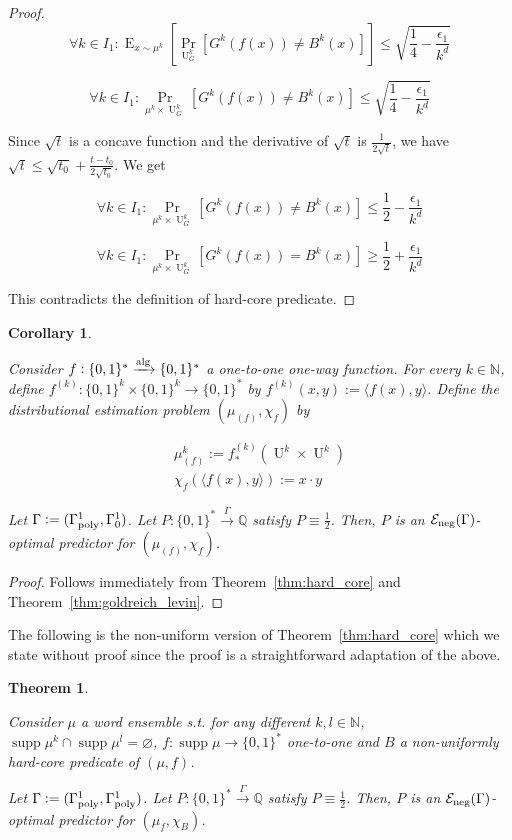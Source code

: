\documentclass{article}
\numberwithin{equation}{section}
\theoremstyle{definition}
\theoremstyle{plain}
\newtheorem{theorem}{Theorem}[section]
\newtheorem{corollary}{Corollary}[section]
\newcommand{\Bool}{\{0,1\}}
\newcommand{\Words}{{\Bool^*}}
\newcommand{\WordsLen}[1]{{\Bool^{#1}}}
\DeclareMathOperator{\Supp}{supp}
\DeclareMathOperator{\Prb}{Pr}
\DeclareMathOperator{\E}{E}
\DeclareMathOperator{\Un}{U}
\newcommand{\Nats}{\mathbb{N}}
\newcommand{\Rats}{\mathbb{Q}}
\newcommand{\Chev}[1]{\langle #1 \rangle}
\newcommand{\Fall}{\mathcal{E}}
\newcommand{\Alg}{\xrightarrow{\textnormal{alg}}}
\newcommand{\Scheme}{\xrightarrow{\Gamma}}
\begin{document}
\begin{proof}
$$ \forall k \in I_1: \E_{x \sim \mu^k}[\Prb_{\Un_G^k}[G^k(f(x)) \ne B^k(x)]] \leq \sqrt{\frac{1}{4} - \frac{\epsilon_1}{k^d}} $$

$$ \forall k \in I_1: \Prb_{\mu^{k} \times \Un_G^k}[G^k(f(x)) \ne B^k(x)] \leq \sqrt{\frac{1}{4} - \frac{\epsilon_1}{k^d}} $$

Since $\sqrt{t}$ is a concave function and the derivative of $\sqrt{t}$ is $\frac{1}{2\sqrt{t}}$, we have $\sqrt{t} \leq \sqrt{t_0} + \frac{t-t_0}{2\sqrt{t_0}}$. We get

$$ \forall k \in I_1: \Prb_{\mu^{k} \times \Un_G^k}[G^k(f(x)) \ne B^k(x)] \leq \frac{1}{2}-\frac{\epsilon_1}{k^d}$$

$$ \forall k \in I_1: \Prb_{\mu^{k} \times \Un_G^k}[G^k(f(x)) = B^k(x)] \geq \frac{1}{2}+\frac{\epsilon_1}{k^d}$$

This contradicts the definition of hard-core predicate.
\end{proof}

\begin{corollary}
\label{crl:one_way}

Consider $f: \Words \Alg \Words$ a one-to-one one-way function. For every ${k \in \Nats}$, define $f^{(k)}: \WordsLen{k} \times \WordsLen{k} \rightarrow \Words$ by ${f^{(k)}(x,y):=\Chev{f(x),y}}$. Define the distributional estimation problem $(\mu_{(f)}, \chi_f)$ by 

\begin{align*}
\mu_{(f)}^k:=f_*^{(k)}(\Un^k \times \Un^k) \\
\chi_f(\Chev{f(x),y}):=x \cdot y
\end{align*}

Let $\Gamma:=(\Gamma_{\textnormal{poly}}^1,\Gamma_0^1)$. Let $P: \Words \Scheme \Rats$ satisfy $P \equiv \frac{1}{2}$. Then, $P$ is an $\Fall_{\textnormal{neg}}(\Gamma)$-optimal predictor for $(\mu_{(f)}, \chi_f)$.

\end{corollary}

\begin{proof}

Follows immediately from Theorem~\ref{thm:hard_core} and Theorem~\ref{thm:goldreich_levin}.
\end{proof}

The following is the non-uniform version of Theorem~\ref{thm:hard_core} which we state without proof since the proof is a straightforward adaptation of the above.

\begin{theorem}
\label{thm:hard_core_circ}

Consider $\mu$ a word ensemble s.t. for any different $k,l \in \Nats$, $\Supp \mu^k \cap \Supp \mu^l = \varnothing$, $f: \Supp \mu \rightarrow \Words$ one-to-one and $B$ a non-uniformly hard-core predicate of $(\mu,f)$. 

Let $\Gamma:=(\Gamma_{\textnormal{poly}}^1,\Gamma_{\textnormal{poly}}^1)$. Let $P: \Words \Scheme \Rats$ satisfy $P \equiv \frac{1}{2}$. Then, $P$ is an $\Fall_{\textnormal{neg}}(\Gamma)$-optimal predictor for $(\mu_f, \chi_B)$.

\end{theorem}
\end{document}
